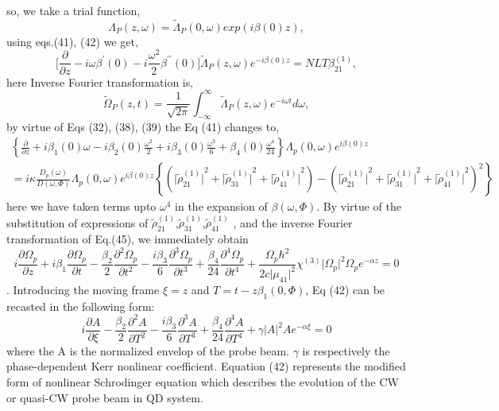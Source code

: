 \documentclass[12pt,a4paper]{article}
\begin{document}
so, we take a trial function,
\begin{equation}
    \Lambda_P(z,\omega)=\tilde\Lambda_P(0,\omega)exp(i\beta(0)z),
\end{equation}
using eqs.(41), (42) we get,
\begin{equation}
    \big[\frac{\partial}{\partial z}-i\omega\beta^\prime(0)-i\frac{\omega^2}{2}\beta^{\prime\prime}(0)\big]\tilde\Lambda_P(z,\omega)e^{-i\beta(0)z}=NLT\beta^{(1)}_{21},
\end{equation}
here Inverse Fourier transformation is,
\begin{equation}
    \tilde\Omega_P(z,t)=\frac{1}{\sqrt{2\pi}}\int_{-\infty}^{\infty}\tilde\Lambda_P(z,\omega)e^{-i\omega t}d\omega,
\end{equation}
by virtue of Eqs (32), (38), (39) the Eq (41) changes to,
\begin{multline}
    {\left\lbrace{\frac{\partial}{\partial z}}+{i\beta_{1}(0)}     \omega -{i\beta_{2}(0)}\frac{\omega^2}{2}+{i\beta_{3}(0)}  \frac{\omega^3}{6}+{\beta_{4}(0)}\frac{\omega^4}{24}  \right\rbrace}{\Lambda_p{(0,\omega)}}e^{i{\beta{(0)}z}} \\ = {i\kappa}\frac{D_p{(\omega)}}{D{(\omega,\Phi)}}{\Lambda_p{(0,\omega)}}e^{i{\beta{(0)}z}}{\left\lbrace{{\left({\vert\tilde\rho^{(1)}_{21}\vert}^{2}+{\vert\tilde\rho^{(1)}_{31}\vert}^{2}+{\vert\tilde\rho^{(1)}_{41}\vert}^{2}\right)}-{\left({\vert\tilde\rho^{(1)}_{21}\vert}^{2}+{\vert\tilde\rho^{(1)}_{31}\vert}^{2}+{\vert\tilde\rho^{(1)}_{41}\vert}^{2}\right)}^2}\right\rbrace}
\end{multline}
here we have taken terms upto $\omega^{4}$ in the expansion of $\beta{(\omega ,\Phi)}$. By virtue of the substitution of expressions of $\tilde\rho^{(1)}_{21}$,$\tilde\rho^{(1)}_{31}$,$\tilde\rho^{(1)}_{41}$ , and the inverse Fourier transformation of Eq.(45), we immediately obtain   
\begin{equation}
    {i\frac{\partial {\Omega_p}}{\partial z}}+{i\beta_{1}}{\frac{\partial {\Omega_p}}{\partial t}} -\frac{{\beta_{2}}}{2}{\frac{\partial^{2} {\Omega_p}}{\partial t^{2}}}-\frac{{i\beta_{3}}}{6}{\frac{\partial^{3} {\Omega_p}}{\partial t^{3}}}+\frac{{\beta_{4}}}{24}{\frac{\partial^{4} {\Omega_p}}{\partial t^{4}}}+{\frac{\Omega_{p}{\hbar}^{2}}{2c{\vert\mu_{41}\vert}^{2}}}{\chi^{(3)}}{\vert\Omega_{p}\vert}^{2}{\Omega_p}e^{-\alpha z} = 0
\end{equation}.
Introducing the moving frame $\xi = z$ and $T=t-z\beta_{1}{(0,\Phi)}$, Eq (42) can be recasted in the following form:
\begin{equation}
    {i\frac{\partial {A}}{\partial \xi}}-\frac{{\beta_{2}}}{2}{\frac{\partial^{2} {A}}{\partial T^{2}}}-\frac{{i\beta_{3}}}{6}{\frac{\partial^{3} {A}}{\partial T^{3}}}+\frac{{\beta_{4}}}{24}{\frac{\partial^{4} {A}}{\partial T^{4}}}+{\gamma}{\vert{A}\vert}^{2}Ae^{-\alpha \xi} = 0
\end{equation}
where the A is the normalized envelop of the probe beam. $\gamma$ is respectively the phase-dependent Kerr nonlinear coefficient. Equation (42) represents the modified form of nonlinear Schrodinger equation which describes the evolution of the CW or quasi-CW probe beam in QD system.
\end{document}
